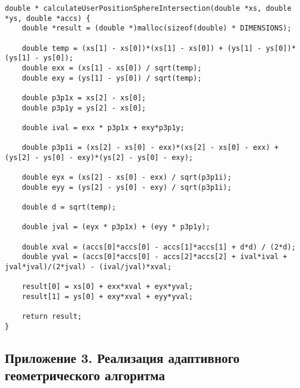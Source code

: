 \begin{lstlisting}
double * calculateUserPositionSphereIntersection(double *xs, double *ys, double *accs) {
    double *result = (double *)malloc(sizeof(double) * DIMENSIONS);

    double temp = (xs[1] - xs[0])*(xs[1] - xs[0]) + (ys[1] - ys[0])*(ys[1] - ys[0]);
    double exx = (xs[1] - xs[0]) / sqrt(temp);
    double exy = (ys[1] - ys[0]) / sqrt(temp);
    
    double p3p1x = xs[2] - xs[0];
    double p3p1y = ys[2] - xs[0];
    
    double ival = exx * p3p1x + exy*p3p1y;
    
    double p3p1i = (xs[2] - xs[0] - exx)*(xs[2] - xs[0] - exx) + (ys[2] - ys[0] - exy)*(ys[2] - ys[0] - exy);
    
    double eyx = (xs[2] - xs[0] - exx) / sqrt(p3p1i);
    double eyy = (ys[2] - ys[0] - exy) / sqrt(p3p1i);
    
    double d = sqrt(temp);
    
    double jval = (eyx * p3p1x) + (eyy * p3p1y);
    
    double xval = (accs[0]*accs[0] - accs[1]*accs[1] + d*d) / (2*d);
    double yval = (accs[0]*accs[0] - accs[2]*accs[2] + ival*ival + jval*jval)/(2*jval) - (ival/jval)*xval;
    
    result[0] = xs[0] + exx*xval + eyx*yval;
    result[1] = ys[0] + exy*xval + eyy*yval;
    
    return result;
}
\end{lstlisting}


\subsection*{Приложение 3. Реализация адаптивного геометрического алгоритма}

